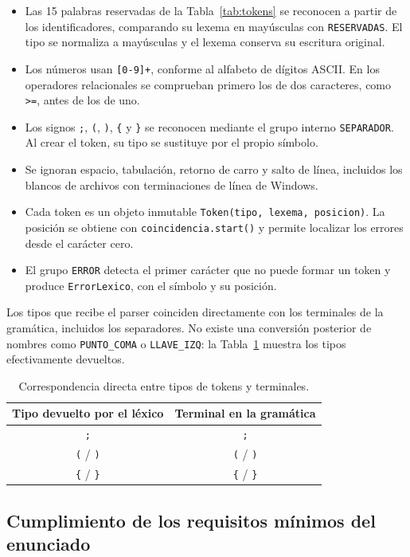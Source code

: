\documentclass[10pt,a4paper]{article}
\newcommand{\tm}[1]{\texttt{#1}}                                          %
\begin{document}
\begin{itemize}[nosep]
\item Las 15 palabras reservadas de la Tabla~\ref{tab:tokens} se reconocen a partir de los identificadores,
comparando su lexema en mayúsculas con \tm{RESERVADAS}. El tipo se normaliza a mayúsculas y
el lexema conserva su escritura original.
\item Los números usan \tm{[0-9]+}, conforme al alfabeto de dígitos ASCII. En los operadores
relacionales se comprueban primero los de dos caracteres, como \tm{>=}, antes de los de uno.
\item Los signos \tm{;}, \tm{(}, \tm{)}, \tm{\{} y \tm{\}} se reconocen mediante el grupo interno
\tm{SEPARADOR}. Al crear el token, su tipo se sustituye por el propio símbolo.
\item Se ignoran espacio, tabulación, retorno de carro y salto de línea, incluidos los blancos de
archivos con terminaciones de línea de Windows.
\item Cada token es un objeto inmutable \tm{Token(tipo, lexema, posicion)}. La posición se obtiene
con \tm{coincidencia.start()} y permite localizar los errores desde el carácter cero.
\item El grupo \tm{ERROR} detecta el primer carácter que no puede formar un token y produce
\tm{ErrorLexico}, con el símbolo y su posición.
\end{itemize}

Los tipos que recibe el parser coinciden directamente con los terminales de la gramática,
incluidos los separadores. No existe una conversión posterior de nombres como
\tm{PUNTO\_COMA} o \tm{LLAVE\_IZQ}: la Tabla~\ref{tab:corresp} muestra los tipos efectivamente devueltos.

\begin{table}[H]
\centering\small
\begin{tabular}{|c|c|}
\hline
\textbf{Tipo devuelto por el léxico} & \textbf{Terminal en la gramática} \\
\hline
\tm{;} & \tm{;} \\
\hline
\tm{(} / \tm{)} & \tm{(} / \tm{)} \\
\hline
\tm{\{} / \tm{\}} & \tm{\{} / \tm{\}} \\
\hline
\end{tabular}
\caption{Correspondencia directa entre tipos de tokens y terminales.}
\label{tab:corresp}
\end{table}

\subsection{Cumplimiento de los requisitos mínimos del enunciado}
\end{document}
